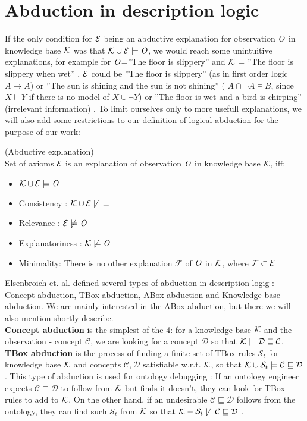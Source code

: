 \section{Abduction in description logic}
If the only condition for $\mathcal{E}$ being an abductive explanation for observation $\mathit{O}$ in knowledge base $\mathcal{K}$ was that $\mathcal{K} \cup \mathcal{E} \models \mathit{O}$, we would reach some unintuitive explanations, for example for $\mathit{O}$=''The floor is slippery'' and $\mathcal{K}$ = ''The floor is slippery when wet'' , $\mathcal{E}$ could be ''The floor is slippery'' (as in first order logic $A \to A$) or  ''The sun is shining and the sun is not shining'' ( $A \cap \neg A \models B$, since $X \models Y$ if there is no model of $X \cup \neg Y$) or ''The floor is wet and a bird is chirping'' (irrelevant information) . To limit ourselves only to more usefull explanations, we will also add some restrictions to our definition of logical abduction for the purpose of our work:
\begin{mydef} \label{explanation1} (Abductive explanation) \cite{elsenbroich} \\
Set of axioms $\mathcal{E}$ is an explanation of observation $\mathit{O}$ in knowledge base $\mathcal{K}$, iff:
\begin{itemize}
\item $\mathcal{K} \cup \mathcal{E} \models \mathit{O}$
\item Consistency : $\mathcal{K} \cup \mathcal{E} \not\models \bot$
\item Relevance : $\mathcal{E} \not\models \mathit{O}$
\item Explanatoriness : $\mathcal{K} \not\models \mathit{O}$
\item Minimality: There is no other explanation $\mathcal{F}$ of $\mathit{O}$ in $\mathcal{K}$, where $\mathcal{F} \subset \mathcal{E}$
\end{itemize}
\end{mydef}
Elsenbroich et. al. \cite{elsenbroich} defined several types of abduction in description logig : Concept abduction, TBox abduction, ABox abduction and Knowledge base abduction. We are mainly interested in the ABox abduction, but there we will also mention shortly describe. \\
\textbf{Concept abduction} is the simplest of the 4: for a knowledge base $\mathcal{K}$ and the observation - concept $\mathcal{C}$, we are looking for a concept $\mathcal{D}$ so that $\mathcal{K} \models \mathcal{D} \sqsubseteq \mathcal{C} $.	
\textbf{TBox abduction} is the process of finding a finite set of TBox rules $\mathcal{S}_t$ for knowledge base $\mathcal{K}$ and concepts $\mathcal{C},\mathcal{D}$ satisfiable w.r.t. $\mathcal{K}$, so that $\mathcal{K} \cup \mathcal{S}_t  \models 	\mathcal{C} \sqsubseteq \mathcal{D} $ . This type of abduction is used for ontology debugging : If an ontology engineer expects $\mathcal{C} \sqsubseteq \mathcal{D}$ to follow from $\mathcal{K}$ but finds it doesn't, they can look for TBox rules to add to $\mathcal{K}$. On the other hand, if an undesirable $\mathcal{C} \sqsubseteq \mathcal{D}$ follows from the ontology, they can find such $\mathcal{S}_t$ from $\mathcal{K}$ so that $\mathcal{K} - \mathcal{S}_t \not\models \mathcal{C} \sqsubseteq \mathcal{D}$ .  \\
